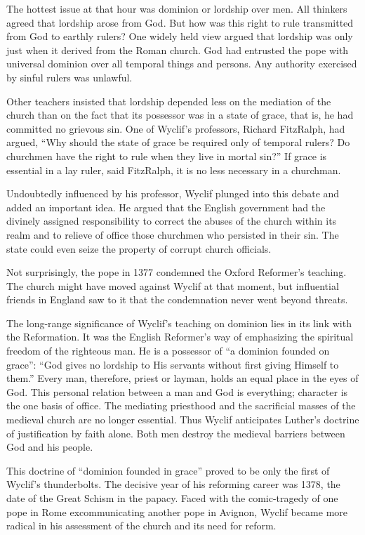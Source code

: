 The hottest issue at that hour was dominion or lordship over men. All thinkers agreed that lordship
arose from God. But how was this right to rule transmitted from God to earthly rulers? One widely
held view argued that lordship was only just when it derived from the Roman church. God had
entrusted the pope with universal dominion over all temporal things and persons. Any authority
exercised by sinful rulers was unlawful.

Other teachers insisted that lordship depended less on the mediation of the church than on the fact
that its possessor was in a state of grace, that is, he had committed no grievous sin. One of
Wyclif’s professors, Richard FitzRalph, had argued, “Why should the state of grace be required only
of temporal rulers? Do churchmen have the right to rule when they live in mortal sin?” If grace is
essential in a lay ruler, said FitzRalph, it is no less necessary in a churchman.

Undoubtedly influenced by his professor, Wyclif plunged into this debate and added an important
idea. He argued that the English government had the divinely assigned responsibility to correct the
abuses of the church within its realm and to relieve of office those churchmen who persisted in
their sin. The state could even seize the property of corrupt church officials.

Not surprisingly, the pope in 1377 condemned the Oxford Reformer’s teaching. The church might have
moved against Wyclif at that moment, but influential friends in England saw to it that the
condemnation never went beyond threats.

The long-range significance of Wyclif’s teaching on dominion lies in its link with the Reformation.
It was the English Reformer’s way of emphasizing the spiritual freedom of the righteous man. He is a
possessor of “a dominion founded on grace”: “God gives no lordship to His servants without first
giving Himself to them.” Every man, therefore, priest or layman, holds an equal place in the eyes of
God. This personal relation between a man and God is everything; character is the one basis of
office. The mediating priesthood and the sacrificial masses of the medieval church are no longer
essential. Thus Wyclif anticipates Luther’s doctrine of justification by faith alone. Both men
destroy the medieval barriers between God and his people.

This doctrine of “dominion founded in grace” proved to be only the first of Wyclif’s thunderbolts.
The decisive year of his reforming career was 1378, the date of the Great Schism in the papacy.
Faced with the comic-tragedy of one pope in Rome excommunicating another pope in Avignon, Wyclif
became more radical in his assessment of the church and its need for reform.

